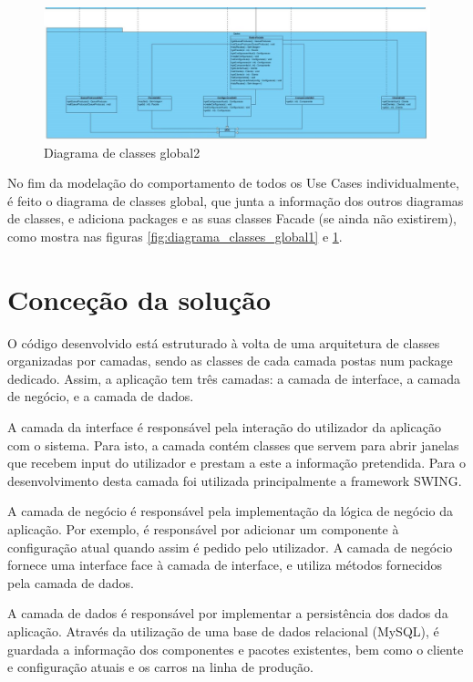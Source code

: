 \documentclass{llncs}
\newcommand\tab[1][0.5cm]{\hspace*{#1}}
\begin{document}
\begin{figure}
\begin{center}
\includegraphics[scale=0.33]{diagrama_classes_global2.jpg}
\end{center}
\caption{\label{fig:diagrama_classes_global2}Diagrama de classes global2}
\end{figure}

\tab No fim da modelação do comportamento de todos os Use Cases individualmente, é feito o diagrama de classes global, que junta a informação dos outros diagramas de classes, e adiciona packages e as suas classes Facade (se ainda não existirem), como mostra nas figuras \ref{fig:diagrama_classes_global1} e \ref{fig:diagrama_classes_global2}.

\clearpage
\section{Conceção da solução} %

O código desenvolvido está estruturado à volta de uma arquitetura de classes organizadas por camadas, sendo as classes de cada camada postas num package dedicado. Assim, a aplicação tem três camadas: a camada de interface, a camada de negócio, e a camada de dados.

\tab A camada da interface é responsável pela interação do utilizador da aplicação com o sistema. Para isto, a camada contém classes que servem para abrir janelas que recebem input do utilizador e prestam a este a informação pretendida. Para o desenvolvimento desta camada foi utilizada principalmente a framework SWING.

\tab A camada de negócio é responsável pela implementação da lógica de negócio da aplicação. Por exemplo, é responsável por adicionar um componente à configuração atual quando assim é pedido pelo utilizador. A camada de negócio fornece uma interface face à camada de interface, e utiliza métodos fornecidos pela camada de dados.

\tab A camada de dados é responsável por implementar a persistência dos dados da aplicação. Através da utilização de uma base de dados relacional (MySQL), é guardada a informação dos componentes e pacotes existentes, bem como o cliente e configuração atuais e os carros na linha de produção.
\end{document}
